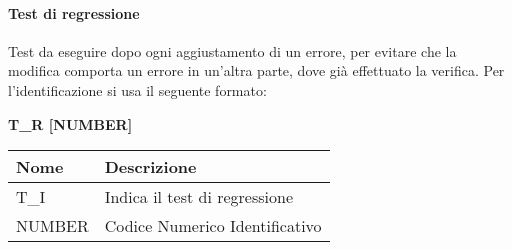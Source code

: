 \paragraph{Test di regressione}  \hfill \break
Test da eseguire dopo ogni aggiustamento di un errore, per evitare che la modifica comporta un errore in un’altra parte, dove già effettuato la verifica.\newline
Per l’identificazione si usa il seguente formato:
\begin{center}
    \textbf{T\_R [NUMBER]}
\end{center}
\renewcommand{\arraystretch}{1.8} 
 \begin{tabular}{ |m{7em}|m{30em}| }
        \hline
        \textbf{Nome} & \textbf{Descrizione} \\
        \hline
            T\_I & Indica il test di regressione \\
        \hline
            NUMBER & Codice Numerico Identificativo \\
        \hline
 \end{tabular}
